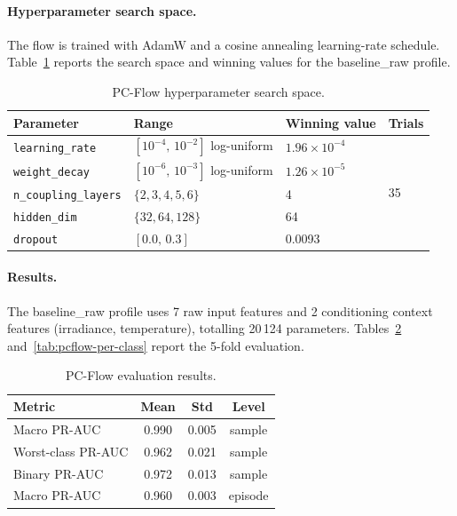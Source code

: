\paragraph{Hyperparameter search space.}
The flow is trained with AdamW and a cosine annealing learning-rate schedule. Table~\ref{tab:pcflow-hpo} reports the search space and winning values for the baseline\_raw profile.
\begin{table}[H]
\centering
\caption{PC-Flow hyperparameter search space.\label{tab:pcflow-hpo}}
\begin{tabular}{llll}
\toprule
\textbf{Parameter} & \textbf{Range} & \textbf{Winning value} & \textbf{Trials} \\
\midrule
\texttt{learning\_rate}      & $[10^{-4},\,10^{-2}]$ log-uniform & $1.96\times10^{-4}$ & \multirow{5}{*}{35} \\
\texttt{weight\_decay}       & $[10^{-6},\,10^{-3}]$ log-uniform & $1.26\times10^{-5}$ & \\
\texttt{n\_coupling\_layers} & $\{2,3,4,5,6\}$                   & 4                   & \\
\texttt{hidden\_dim}         & $\{32,64,128\}$                   & 64                  & \\
\texttt{dropout}             & $[0.0,\,0.3]$                     & 0.0093              & \\
\bottomrule
\end{tabular}
\end{table}

\paragraph{Results.}
The baseline\_raw profile uses 7 raw input features and 2 conditioning context features (irradiance, temperature), totalling 20\,124 parameters. Tables~\ref{tab:pcflow-results} and~\ref{tab:pcflow-per-class} report the 5-fold evaluation.
\begin{table}[H]
\centering
\caption{PC-Flow evaluation results.\label{tab:pcflow-results}}
\begin{tabular}{lccc}
\toprule
\textbf{Metric} & \textbf{Mean} & \textbf{Std} & \textbf{Level} \\
\midrule
Macro PR-AUC & 0.990 & 0.005 & sample \\
Worst-class PR-AUC     & 0.962 & 0.021 & sample \\
Binary PR-AUC          & 0.972 & 0.013 & sample \\
Macro PR-AUC & 0.960 & 0.003 & episode \\
\bottomrule
\end{tabular}
\end{table}


